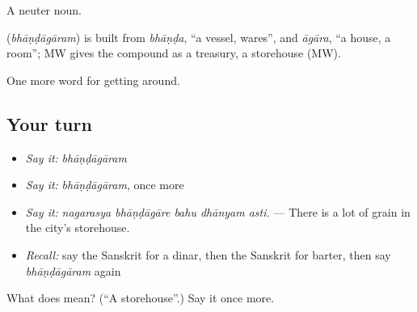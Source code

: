 A neuter noun.

\begin{cousinweb}
\textbf{} (\emph{bhāṇḍāgāram}) is built from \emph{bhāṇḍa}, \textquotedblleft{}a vessel, wares\textquotedblright{}, and \emph{āgāra}, \textquotedblleft{}a house, a room\textquotedblright{}; MW gives the compound as a treasury, a storehouse (MW).
\end{cousinweb}

\begin{grammarlens}[title={What you've built}]
One more word for getting around.
\end{grammarlens}

\subsection*{Your turn}
\begin{itemize}
\raggedright
  \item \emph{Say it:} \emph{bhāṇḍāgāram}
  \item \emph{Say it:} \emph{bhāṇḍāgāram}, once more
  \item \emph{Say it:} \emph{nagarasya bhāṇḍāgāre bahu dhānyam asti.} — There is a lot of grain in the city's storehouse.
  \item \emph{Recall:} say the Sanskrit for a dinar, then the Sanskrit for barter, then say \emph{bhāṇḍāgāram} again
\end{itemize}

\begin{tcolorbox}[breakable,colback=teal!4,colframe=teal!35!black,title={Before you move on}]
What does  mean? (\textquotedblleft{}A storehouse\textquotedblright{}.) Say it once more.
\end{tcolorbox}
